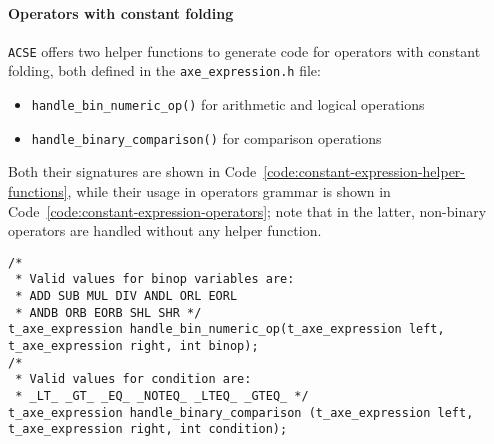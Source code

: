 \paragraph*{Operators with constant folding}

\texttt{ACSE} offers two helper functions to generate code for operators with constant folding, both defined in the \texttt{axe\_expression.h} file:

\begin{itemize}[label=\textbf{\texttt{>}}]
  \item \texttt{handle\_bin\_numeric\_op()} for arithmetic and logical operations
  \item \texttt{handle\_binary\_comparison()} for comparison operations
\end{itemize}

Both their signatures are shown in Code~\ref{code:constant-expression-helper-functions}, while their usage in operators grammar is shown in Code~\ref{code:constant-expression-operators};
note that in the latter, non-binary operators are handled without any helper function.

\begin{onepage}
  \begin{lstlisting}[language=LANCE, caption={Constant expression helper functions in \texttt{axe\_expression.h}}, label={code:constant-expression-helper-functions}]
/*
 * Valid values for binop variables are:
 * ADD SUB MUL DIV ANDL ORL EORL
 * ANDB ORB EORB SHL SHR */
t_axe_expression handle_bin_numeric_op(t_axe_expression left, t_axe_expression right, int binop);
/*
 * Valid values for condition are:
 * _LT_ _GT_ _EQ_ _NOTEQ_ _LTEQ_ _GTEQ_ */
t_axe_expression handle_binary_comparison (t_axe_expression left, t_axe_expression right, int condition);
\end{lstlisting}
\end{onepage}


